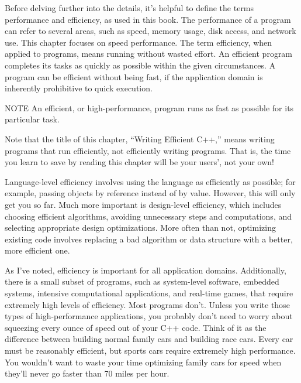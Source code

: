 
Before delving further into the details, it’s helpful to define the terms performance and efficiency, as used in this book. The performance of a program can refer to several areas, such as speed, memory usage, disk access, and network use. This chapter focuses on speed performance. The term efficiency, when applied to programs, means running without wasted effort. An efficient program completes its tasks as quickly as possible within the given circumstances. A program can be efficient without being fast, if the application domain is inherently prohibitive to quick execution.

\begin{myNotic}{NOTE}
An efficient, or high-performance, program runs as fast as possible for its particular task.
\end{myNotic}

Note that the title of this chapter, “Writing Efficient C++,” means writing programs that run efficiently, not efficiently writing programs. That is, the time you learn to save by reading this chapter will be your users’, not your own!


Language-level efficiency involves using the language as efficiently as possible; for example, passing objects by reference instead of by value. However, this will only get you so far. Much more important is design-level efficiency, which includes choosing efficient algorithms, avoiding unnecessary steps and computations, and selecting appropriate design optimizations. More often than not, optimizing existing code involves replacing a bad algorithm or data structure with a better, more efficient one.


As I’ve noted, efficiency is important for all application domains. Additionally, there is a small subset of programs, such as system-level software, embedded systems, intensive computational applications, and real-time games, that require extremely high levels of efficiency. Most programs don’t. Unless you write those types of high-performance applications, you probably don’t need to worry about squeezing every ounce of speed out of your C++ code. Think of it as the difference between building normal family cars and building race cars. Every car must be reasonably efficient, but sports cars require extremely high performance. You wouldn’t want to waste your time optimizing family cars for speed when they’ll never go faster than 70 miles per hour.

